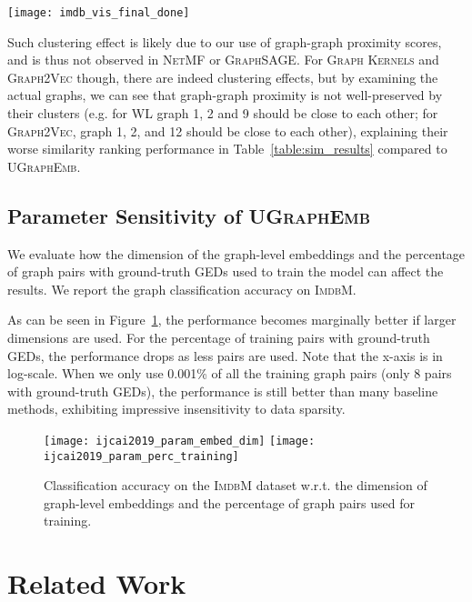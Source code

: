 \documentclass{article}
\newcommand{\model}{\textsc{UGraphEmb}\xspace}
\newcommand{\netmf}{\textsc{NetMF}\xspace}
\newcommand{\graphsage}{\textsc{GraphSAGE}\xspace}
\newcommand{\gk}{\textsc{Graph Kernels}\xspace}
\newcommand{\gv}{\textsc{Graph2Vec}\xspace}
\newcommand{\imdb}{\textsc{ImdbM}\xspace}
\begin{document}
\begin{figure*}[h]
\centering
\texttt{[image: imdb\_vis\_final\_done]}
\caption{Visualization of the \imdb dataset. From (a) to (g), for each method, 12 graphs are plotted. For (h) to (l), we focus on \model: 5 clusters are highlighted in red circles. 12 graphs are sampled from each cluster and plotted to the right.}
\label{fig:imdb_vis}
\vspace*{-3mm}
\end{figure*}



Such clustering effect is likely due to our use of graph-graph proximity scores, and is thus not observed in \netmf or \graphsage. For \gk and \gv though, there are indeed clustering effects, but by examining the actual graphs, we can see that graph-graph proximity is not well-preserved by their clusters (e.g. for \textsc{WL} graph 1, 2 and 9 should be close to each other; for \gv, graph 1, 2, and 12 should be close to each other), explaining their worse similarity ranking performance in Table~\ref{table:sim_results} compared to \model. 










\subsection{Parameter Sensitivity of \model}

We evaluate how the dimension of the graph-level embeddings and the percentage of graph pairs with ground-truth GEDs used to train the model can affect the results. We report the graph classification accuracy on \imdb. 

As can be seen in Figure~\ref{fig:param}, the performance becomes marginally better if larger dimensions are used. For the percentage of training pairs with ground-truth GEDs, the performance drops as less pairs are used. Note that the x-axis is in log-scale. When we only use 0.001\% of all the training graph pairs (only 8 pairs with ground-truth GEDs), the performance is still better than many baseline methods, exhibiting impressive insensitivity to data sparsity. 


\begin{figure}
   \centering
   {{\texttt{[image: ijcai2019\_param\_embed\_dim]}}}
   {{\texttt{[image: ijcai2019\_param\_perc\_training]}}}
   \caption{Classification accuracy on the \imdb dataset w.r.t. the dimension of graph-level embeddings and the percentage of graph pairs used for training.}
   \label{fig:param}
  \vspace*{-2mm}
\end{figure} \section{Related Work}
\label{sec-related}
\end{document}
